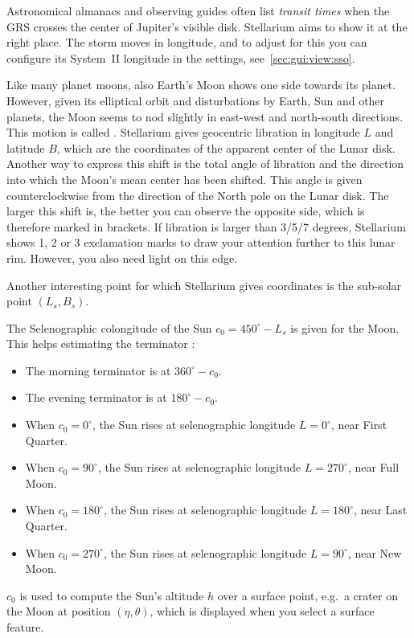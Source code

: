 Astronomical almanacs and observing guides often list \emph{transit
  times} when the GRS crosses the center of Jupiter's visible
disk. Stellarium aims to show it at the right place. The storm moves
in longitude, and to adjust for this you can configure its System~II
longitude in the settings, see~\ref{sec:gui:view:sso}.

Like many planet moons, also Earth's Moon shows one side towards its
planet. However, given its elliptical orbit and disturbations by
Earth, Sun and other planets, the Moon seems to nod slightly in
east-west and north-south directions. This motion is called
.  Stellarium gives geocentric
libration in longitude $L$ and latitude $B$, which are the coordinates
of the apparent center of the Lunar disk. Another way to express this
shift is the total angle of libration and the direction into which the
Moon's mean center has been shifted. This angle is given
counterclockwise from the direction of the North pole on the Lunar
disk. The larger this shift is, the better you can observe the
opposite side, which is therefore marked in brackets. If libration is
larger than 3/5/7 degrees, Stellarium shows 1, 2 or 3 exclamation
marks to draw your attention further to this lunar rim. However, you
also need light on this edge.

Another interesting point for which Stellarium gives coordinates is
the sub-solar point $(L_s, B_s)$.

The Selenographic colongitude of the Sun $c_0=450^\circ-L_s$ is given for the
Moon. This helps estimating the terminator \citep{AstronomicalAlgorithms:1998}:
\begin{itemize}
\item The morning terminator is at $360^\circ-c_0$.
\item The evening terminator is at $180^\circ-c_0$.
\item When $c_0=0^\circ$, the Sun rises at selenographic longitude $L=0^\circ$, near First Quarter.
\item When $c_0=90^\circ$, the Sun rises at selenographic longitude $L=270^\circ$, near Full Moon.
\item When $c_0=180^\circ$, the Sun rises at selenographic longitude $L=180^\circ$, near Last Quarter.
\item When $c_0=270^\circ$, the Sun rises at selenographic longitude $L=90^\circ$, near New Moon.
\end{itemize}

$c_0$ is used to compute the Sun's altitude $h$ over a surface point,
e.g.\ a crater on the Moon at position $(\eta, \theta)$, which is
displayed when you select a surface feature.

